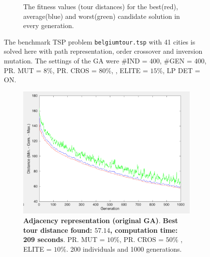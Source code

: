 \begin{figure}[!]
\begin{subfigure}{.45\textwidth}
  \caption{The fitness values (tour distances) for the best(red), average(blue) and worst(green) candidate solution in every generation. \\}
  \label{fig:belgium_tour_4_gen}
\end{subfigure}
\caption{The benchmark TSP problem \texttt{belgiumtour.tsp} with 41 cities is solved here with path representation, order crossover and inversion mutation. The settings of the GA were \#IND = 400, \#GEN = 400, PR. MUT = $8\%$, PR. CROS = $80\%$, , ELITE = $15\%$, LP DET = ON.}
\label{fig:belgium_tour_4}
\end{figure}

\begin{figure}[!]
\centering
\begin{subfigure}{0.45\textwidth}
  \centering
  \includegraphics[width=1\textwidth]{../figures/figures_question_4/adj_vraag4_off_gen}
      \caption{\textbf{Adjacency representation (original GA)}. \textbf{Best tour distance found: $\mathbf{57.14}$, computation time: 209 seconds}. PR. MUT = $10\%$, PR. CROS = $50\%$ , ELITE = $10\%$. 200 individuals and 1000 generations.} 
      \label{fig:adj_vraag4_off_gen}
\end{subfigure}%
\hspace{0.05\textwidth}
\begin{subfigure}{0.45\textwidth}
  \centering

\end{subfigure}
\end{figure}
